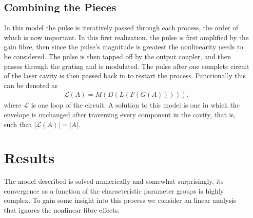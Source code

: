 \documentclass[12pt]{article}
\begin{document}
\subsection{Combining the Pieces}
In this model the pulse is iteratively passed through each process, the order of which is now important. In this first realization, the pulse is first amplified by the gain fibre, then since the pulse's magnitude is greatest the nonlinearity needs to be considered. The pulse is then tapped off by the output coupler, and then passes through the grating and is modulated. The pulse after one complete circuit of the laser cavity is then passed back in to restart the process. Functionally this can be denoted as
\begin{align*}
	\mathcal{L}(A) = M(D(L(F(G(A))))),
\end{align*}
where $\mathcal{L}$ is one loop of the circuit. A solution to this model is one in which the envelope is unchanged after traversing every component in the cavity, that is, such that $|\mathcal{L}(A)| = |A|$.

\section{Results}
The model described is solved numerically and somewhat surprisingly, its convergence as a function of the characteristic parameter groups is highly complex. To gain some insight into this process we consider an linear analysis that ignores the nonlinear fibre effects.
\end{document}
